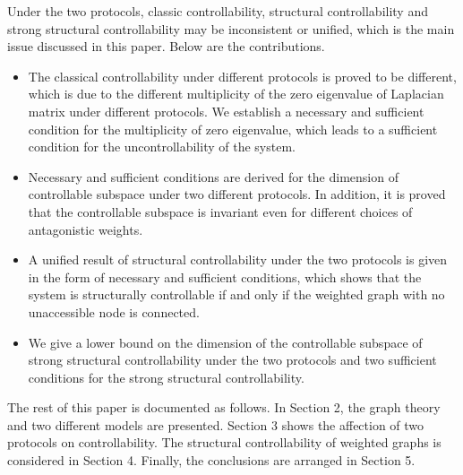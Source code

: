 \documentclass[a4paper,11pt]{article}
\begin{document}
Under the two protocols, classic controllability, structural controllability and strong structural controllability may be inconsistent or unified, which is the main issue discussed in this paper. Below are the contributions.
 \begin{itemize}
   \item The classical controllability under different protocols is proved to be different, which is due to the different multiplicity of the zero eigenvalue of Laplacian matrix under different protocols. We establish a necessary and sufficient condition for the multiplicity of zero eigenvalue, which leads to a sufficient condition for the uncontrollability of the system. %
   \item Necessary and sufficient conditions are derived for the dimension of controllable subspace under two different protocols. In addition, it is proved that the controllable subspace is invariant even for different choices of antagonistic weights.
   \item A unified result of structural controllability under the two protocols is given in the form of necessary and sufficient conditions, which shows that the system is structurally controllable if and only if the weighted graph with no unaccessible node is connected.
   \item We give a lower bound on the dimension of the controllable subspace of strong structural controllability under the two protocols and two sufficient conditions for the strong structural controllability.
 \end{itemize}

The rest of this paper is documented as follows.  In Section 2, the graph theory and two different models are presented. Section 3 shows the affection of two protocols on controllability.  The structural controllability of weighted graphs is considered in Section 4.  Finally, the conclusions are arranged in Section 5.
\end{document}
